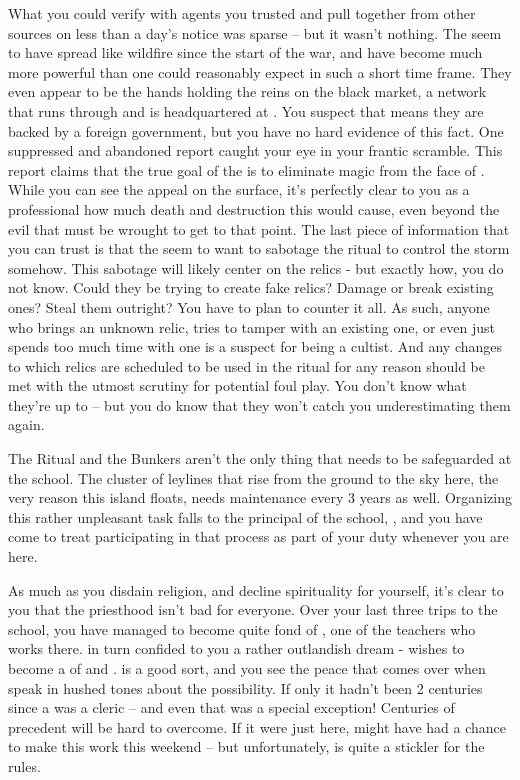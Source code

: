 \documentclass[char]{GL2020}
\begin{document}
What you could verify with agents you trusted and pull together from other sources on less than a day's notice was sparse -- but it wasn’t nothing. The \pGoaties{} seem to have spread like wildfire since the start of the war, and have become much more powerful than one could reasonably expect in such a short time frame. They even appear to be the hands holding the reins on the black market, a network that runs through \pShip{} and is headquartered at \pSc.  You suspect that means they are backed by a foreign government, but you have no hard evidence of this fact. One suppressed and abandoned report caught your eye in your frantic scramble. This report claims that the true goal of the \pGoaties{} is to eliminate magic from the face of \pEarth{}. While you can see the appeal on the surface, it’s perfectly clear to you as a professional how much death and destruction this would cause, even beyond the evil that must be wrought to get to that point. The last piece of information that you can trust is that the \pGoaties{} seem to want to sabotage the ritual to control the storm somehow. This sabotage will likely center on the relics - but exactly how, you do not know. Could they be trying to create fake relics? Damage or break existing ones? Steal them outright? You have to plan to counter it all. As such, anyone who brings an unknown relic, tries to tamper with an existing one, or even just spends too much time with one is a suspect for being a cultist. And any changes to which relics are scheduled to be used in the ritual for any reason should be met with the utmost scrutiny for potential foul play. You don’t know what they’re up to -- but you do know that they won’t catch you underestimating them again.

The Ritual and the Bunkers aren’t the only thing that needs to be safeguarded at the school. The cluster of leylines that rise from the ground to the sky here, the very reason this island floats, needs maintenance every 3 years as well. Organizing this rather unpleasant task falls to the principal of the school, \cPrincipal{}, and you have come to treat participating in that process as part of your duty whenever you are here.

As much as you disdain religion, and decline spirituality for yourself, it’s clear to you that the priesthood isn’t bad for everyone. Over your last three trips to the school, you have managed to become quite fond of \cPirate{}, one of the \pShip{} teachers who works there. \cPirate{\They} in turn \cPirate{\have} confided to you a rather outlandish dream - \cPirate{} wishes to become a \cPirate{\cleric} of \cEbb{} and \cFlow{}. \cPirate{} is a good sort, and you see the peace that comes over \cPirate{\them} when \cPirate{\they} speak in hushed tones about the possibility. If only it hadn’t been 2 centuries since a \cPirate{\person} was a cleric -- and even that was a special exception! Centuries of precedent will be hard to overcome. If it were just \cFlowPriest{} here, \cPirate{} might have had a chance to make this work this weekend -- but unfortunately, \cEbbPriest{} is quite a stickler for the rules.
\end{document}
